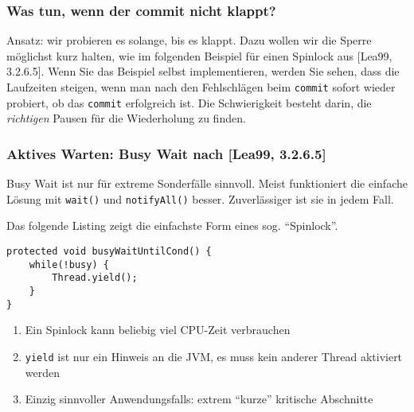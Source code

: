 \subsubsection{Was tun, wenn der commit nicht
klappt?}\label{was-tun-wenn-der-commit-nicht-klappt}

Ansatz: wir probieren es solange, bis es klappt. Dazu wollen wir die
Sperre möglichst kurz halten, wie im folgenden Beispiel für einen
Spinlock aus {[}Lea99, 3.2.6.5{]}. Wenn Sie das Beispiel selbst
implementieren, werden Sie sehen, dass die Laufzeiten steigen, wenn man
nach den Fehlschlägen beim \texttt{commit} sofort wieder probiert, ob
das \texttt{commit} erfolgreich ist. Die Schwierigkeit besteht darin,
die \emph{richtigen} Pausen für die Wiederholung zu finden.

\subsubsection{Aktives Warten: Busy Wait nach {[}Lea99,
3.2.6.5{]}}\label{aktives-warten-busy-wait-nach-lea99-3.2.6.5}

\begin{important}
Busy Wait ist nur für extreme Sonderfälle sinnvoll. Meist funktioniert die
einfache Lösung mit \texttt{wait()} und
\texttt{notifyAll()} besser. Zuverlässiger ist sie in jedem Fall.
\end{important}

Das folgende Listing zeigt die einfachste Form eines sog. ``Spinlock''.

\begin{verbatim}
protected void busyWaitUntilCond() {
    while(!busy) {
        Thread.yield();
    }
}
\end{verbatim}

\begin{enumerate}
\def\labelenumi{\arabic{enumi}.}
\tightlist
\item
  Ein Spinlock kann beliebig viel CPU-Zeit verbrauchen
\item
  \texttt{yield} ist nur ein Hinweis an die JVM, es muss kein
  anderer Thread aktiviert werden
\item
  Einzig sinnvoller Anwendungsfalls: extrem ``kurze'' kritische
  Abschnitte
\end{enumerate}

